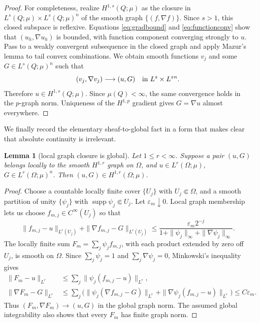 \documentclass[11pt]{article}
\newtheorem{lemma}[theorem]{Lemma}
\begin{document}
\begin{proof}
For completeness, realize \(H^{1,s}(Q;\mu)\) as the closure in
\(L^s(Q;\mu)\times L^s(Q;\mu)^n\) of the smooth graph
\(\{(f,\nabla f)\}\).  Since \(s>1\), this closed subspace is reflexive.
Equations \eqref{eq:gradbound} and \eqref{eq:functionconv} show that
\((u_h,\nabla u_h)\) is bounded, with function component converging strongly
to \(u\).  Pass to a weakly convergent subsequence in the closed graph and
apply Mazur's lemma to tail convex combinations.  We obtain smooth functions
\(v_j\) and some \(G\in L^s(Q;\mu)^n\) such that
\[
          (v_j,\nabla v_j)\longrightarrow(u,G)
          \quad\hbox{in }L^s\times L^s{}^n.
\]
Therefore \(u\in H^{1,s}(Q;\mu)\).  Since \(\mu(Q)<\infty\), the same
convergence holds in the \(p\)-graph norm.  Uniqueness of the
\(H^{1,p}\) gradient gives \(G=\nabla u\) almost everywhere.
\end{proof}

We finally record the elementary sheaf-to-global fact in a form that makes
clear that absolute continuity is irrelevant.

\begin{lemma}[local graph closure is global]\label{lem:global}
Let \(1\le r<\infty\).  Suppose a pair \((u,G)\) belongs locally to the
smooth \(H^{1,r}\) graph on \(\Omega\), and
\(u\in L^r(\Omega;\mu)\), \(G\in L^r(\Omega;\mu)^n\).  Then
\((u,G)\in H^{1,r}(\Omega;\mu)\).
\end{lemma}

\begin{proof}
Choose a countable locally finite cover \(\{U_j\}\) with
\(U_j\Subset\Omega\), and a smooth partition of unity \(\{\psi_j\}\)
with \(\operatorname{supp}\psi_j\Subset U_j\).  Let \(\varepsilon_m\downarrow0\).
Local graph membership lets us choose \(f_{m,j}\in C^\infty(U_j)\) so that
\[
 \|f_{m,j}-u\|_{L^r(U_j)}+
 \|\nabla f_{m,j}-G\|_{L^r(U_j)}
 \le \frac{\varepsilon_m2^{-j}}
  {1+\|\psi_j\|_\infty+\|\nabla\psi_j\|_\infty}.
\]
The locally finite sum \(F_m=\sum_j\psi_j f_{m,j}\), with each product
extended by zero off \(U_j\), is smooth on \(\Omega\).  Since
\(\sum_j\psi_j=1\) and \(\sum_j\nabla\psi_j=0\), Minkowski's inequality
gives
\begin{align*}
 \|F_m-u\|_{L^r}
 &\le\sum_j\|\psi_j(f_{m,j}-u)\|_{L^r},\\
 \|\nabla F_m-G\|_{L^r}
 &\le\sum_j\bigl(\|\psi_j(\nabla f_{m,j}-G)\|_{L^r}
       +\|\nabla\psi_j(f_{m,j}-u)\|_{L^r}\bigr)
 \le C\varepsilon_m.
\end{align*}
Thus \((F_m,\nabla F_m)\to(u,G)\) in the global graph norm.  The assumed
global integrability also shows that every \(F_m\) has finite graph norm.
\end{proof}
\end{document}
